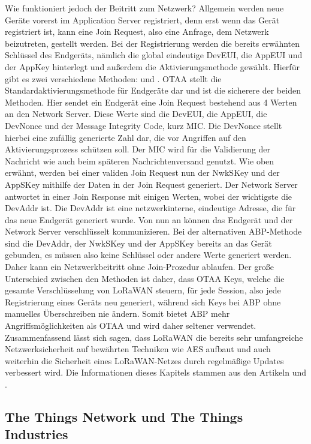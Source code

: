 Wie funktioniert jedoch der Beitritt zum Netzwerk? Allgemein werden neue Geräte vorerst im Application Server registriert, denn erst wenn das Gerät registriert ist, kann eine Join Request, also eine Anfrage, dem Netzwerk beizutreten, gestellt werden. Bei der Registrierung werden die bereits erwähnten Schlüssel des Endgeräts, nämlich die global eindeutige DevEUI, die AppEUI und der AppKey hinterlegt und außerdem die Aktivierungsmethode gewählt. Hierfür gibt es zwei verschie\-dene Methoden:  und . OTAA stellt die Standardaktivierungsmethode für Endgeräte dar und ist die sicherere der beiden Methoden. Hier sendet ein Endgerät eine Join Request bestehend aus 4 Werten an den Network Server. Diese Werte sind die DevEUI, die AppEUI, die DevNonce und der Message Integrity Code, kurz MIC. Die DevNonce stellt hierbei eine zufällig generierte Zahl dar, die vor Angriffen auf den Aktivierungsprozess schützen soll. Der MIC wird für die Validierung der Nachricht wie auch beim späteren Nachrichtenversand genutzt. Wie oben erwähnt, werden bei einer validen Join Request nun der NwkSKey und der AppSKey mithilfe der Daten in der Join Request generiert. Der Network Server antwortet in einer Join Response mit einigen Werten, wobei der wichtigste die DevAddr ist. Die DevAddr ist eine netzwerkinterne, eindeutige Adresse, die für das neue Endgerät generiert wurde. Von nun an können das Endgerät und der Network Server verschlüsselt kommunizieren. Bei der alternativen ABP-Methode sind die DevAddr, der NwkSKey und der AppSKey bereits an das Gerät gebunden, es müssen also keine Schlüssel oder andere Werte generiert werden. Daher kann ein Netzwerkbeitritt ohne Join-Prozedur ablaufen. Der große Unterschied zwischen den Methoden ist daher, dass OTAA Keys, welche die gesamte Verschlüsselung von LoRaWAN steuern, für jede Session, also jede Registrierung eines Geräts neu generiert, während sich Keys bei ABP ohne manuelles Überschreiben nie ändern. Somit bietet ABP mehr Angriffsmöglichkeiten als OTAA und wird daher seltener verwendet. Zusammenfassend lässt sich sagen, dass LoRaWAN die bereits sehr umfangreiche Netzwerksicherheit auf bewährten Techniken wie AES aufbaut und auch weiterhin die Sicherheit eines LoRaWAN-Netzes durch regel\-mäßige Updates verbessert wird. Die Informationen dieses Kapitels stammen aus den Artikeln \cite{TTNSec.2020} und \cite{SmartMakers.2018}.


\subsection{The Things Network und The Things Industries}
\label{sec:ThHi:ttntti}

